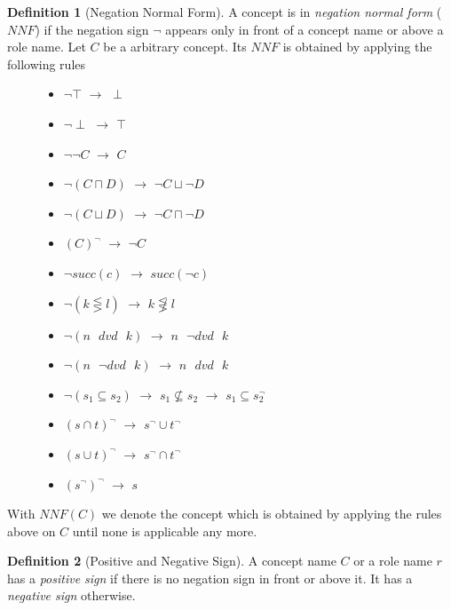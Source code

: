 \documentclass[a4paper,11pt]{scrartcl}
\theoremstyle{break}
\theoremstyle{definition}
\newtheorem{mydef}{Definition}
\begin{document}
\begin{mydef}[Negation Normal Form]
A concept is in \textit{negation normal form} ($NNF$) if the negation sign $\neg$ appears only in front of a concept name or above a role name. Let $C$ be a arbitrary concept. Its $NNF$ is obtained by applying the following rules
\begin{figure}[H]
\begin{minipage}[t]{.5\textwidth}
\raggedright
\begin{itemize}
\item $\neg\top$ $\rightarrow$ $\perp$
\item $\neg\perp$ $\rightarrow$ $\top$
\item $\neg\neg C$ $\rightarrow$ $C$
\item $\neg(C\sqcap D)$ $\rightarrow$ $\neg C \sqcup \neg D$
\item $\neg(C\sqcup D)$ $\rightarrow$ $\neg C \sqcap \neg D$
\item $(C)^\neg$ $\rightarrow$ $\neg C$
\item $\neg succ(c)$ $\rightarrow$ $succ(\neg c)$
\end{itemize}
\end{minipage}%
\begin{minipage}[t]{.5\textwidth}
\raggedleft
\begin{itemize}
\item $\neg (k\lesseqgtr l)$ $\rightarrow$ $k\not\lesseqgtr l$
\item $\neg (n\text{ } dvd \text{ } k)$ $\rightarrow$ $n\text{ } \neg dvd \text{ } k$
\item $\neg (n\text{ } \neg dvd \text{ } k)$ $\rightarrow$ $n\text{ } dvd \text{ } k$
\item $\neg (s_1\subseteq s_2)$ $\rightarrow$ $s_1\not\subseteq s_2$ $\rightarrow$ $s_1\subseteq s_2^\neg$
\item $(s\cap t)^\neg$ $\rightarrow$ $s^\neg \cup t^\neg$
\item $(s\cup t)^\neg$ $\rightarrow$ $s^\neg \cap t^\neg$
\item $(s^\neg)^\neg$ $\rightarrow$ $s$
\end{itemize}
\end{minipage}
\end{figure}
\end{mydef}
With $NNF(C)$ we denote the concept which is obtained by applying the rules above on $C$ until none is applicable any more.
\begin{mydef}[Positive and Negative Sign]
A concept name $C$ or a role name $r$ has a \textit{positive sign} if there is no negation sign in front or above it. It has a \textit{negative sign} otherwise.
\end{mydef}
\end{document}
